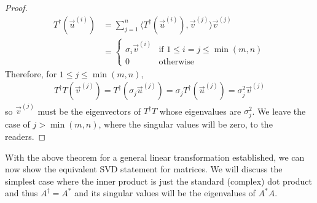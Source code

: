 \begin{proof}
\begin{align}
T^\dag (\vec{u}^{(i)}) &= \sum_{j = 1}^{n} \langle T^\dag (\vec{u}^{(i)}), \vec{v}^{(j)} \rangle \vec{v}^{(j)} \nonumber \\
&= \begin{cases}
\sigma_i\vec{v}^{(i)} & \text{if } 1 \leq i = j \leq \min(m,n) \\
0 & \text{otherwise} 
\end{cases}
\end{align}
Therefore, for $1 \leq j \leq \min(m,n)$,
\begin{align}
T^\dag T(\vec{v}^{(j)}) = T^\dag (\sigma_j \vec{u}^{(j)}) = \sigma_j T^\dag (\vec{u}^{(j)}) = \sigma_j^2 \vec{v}^{(j)}
\end{align}
so $\vec{v}^{(j)}$ must be the eigenvectors of $T^\dag T$ whose eigenvalues are $\sigma_j^2$. We leave the case of $j > \min(m,n)$, where the singular values will be zero, to the readers.
\end{proof}
With the above theorem for a general linear transformation established, we can now show the equivalent SVD statement for matrices. We will discuss the simplest case where the inner product is just the standard (complex) dot product and thus $A^\dag = A^*$ and its singular values will be the eigenvalues of $A^*A$.
